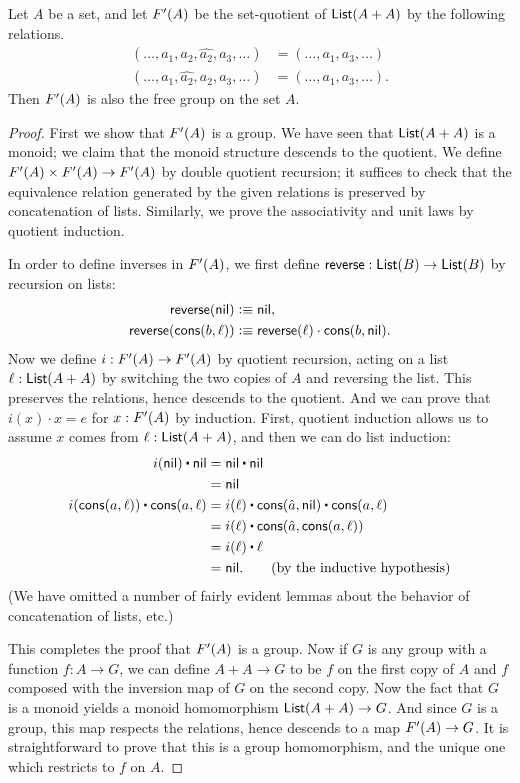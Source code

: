 \begin{thm}
  Let $A$ be a set, and let $F'(A)$ be the set-quotient of $\mathsf{List}(A+A)$ by the following relations.
  \begin{align*}
    (\dots,a_1,a_2,\widehat{a_2},a_3,\dots) &=
    (\dots,a_1,a_3,\dots)\\
    (\dots,a_1,\widehat{a_2},a_2,a_3,\dots) &=
    (\dots,a_1,a_3,\dots).
  \end{align*}
  Then $F'(A)$ is also the free group on the set $A$.
\end{thm}
\begin{proof}
  First we show that $F'(A)$ is a group.
  We have seen that $\mathsf{List}(A+A)$ is a monoid; we claim that the monoid structure descends to the quotient.
  We define $F'(A) \times F'(A) \to F'(A)$ by double quotient recursion; it suffices to check that the equivalence relation generated by the given relations is preserved by concatenation of lists.
  Similarly, we prove the associativity and unit laws by quotient induction.

  In order to define inverses in $F'(A)$, we first define $\mathsf{reverse}:\mathsf{List}(B)\to\mathsf{List}(B)$ by recursion on lists:
  \begin{align*}
    \mathsf{reverse}(\mathsf{nil}) &\vcentcolon\equiv \mathsf{nil},\\
    \mathsf{reverse}(\mathsf{cons}(b,\ell))&\vcentcolon\equiv \mathsf{reverse}(\ell)\cdot \mathsf{cons}(b,\mathsf{nil}).
  \end{align*}
  Now we define $i:F'(A)\to F'(A)$ by quotient recursion, acting on a list $\ell:\mathsf{List}(A+A)$ by switching the two copies of $A$ and reversing the list.
  This preserves the relations, hence descends to the quotient.
  And we can prove that $i(x) \cdot x = e$ for $x:F'(A)$ by induction.
  First, quotient induction allows us to assume $x$ comes from $\ell:\mathsf{List}(A+A)$, and then we can do list induction:
  \begin{align*}
    i(\nil) \ct \nil &= \nil \ct \nil\\
    &= \nil\\
    i(\cons(a,\ell)) \ct \cons(a,\ell) &= i(\ell) \ct \cons(\hat{a},\nil) \ct \cons(a,\ell)\\
    &= i(\ell) \ct \cons(\hat{a},\cons(a,\ell))\\
    &= i(\ell) \ct \ell\\
    &= \nil. \tag{by the inductive hypothesis}
  \end{align*}
  (We have omitted a number of fairly evident lemmas about the behavior of concatenation of lists, etc.)

  This completes the proof that $F'(A)$ is a group.
  Now if $G$ is any group with a function $f:A\to G$, we can define $A+A\to G$ to be $f$ on the first copy of $A$ and $f$ composed with the inversion map of $G$ on the second copy.
  Now the fact that $G$ is a monoid yields a monoid homomorphism $\mathsf{List}(A+A) \to G$.
  And since $G$ is a group, this map respects the relations, hence descends to a map $F'(A)\to G$.
  It is straightforward to prove that this is a group homomorphism, and the unique one which restricts to $f$ on $A$.
\end{proof}

